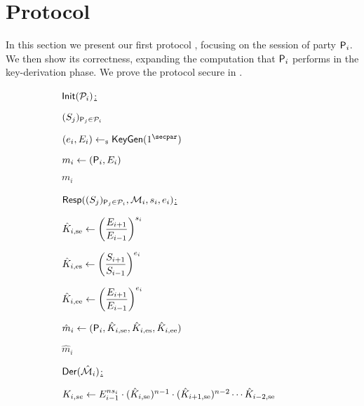 \section{Protocol}\label{sec:protocol}
In this section we present our first protocol , focusing on the session of party $\User[i]$.
We then show its correctness, expanding the computation that $\User[i]$ performs in the key-derivation phase.
We prove the protocol secure  in .

\begin{figure}
	\begin{adjustbox}{varwidth=0.9\textwidth,fbox,center,scale=0.92}
	\begin{subfigure}[t]{.45\linewidth}
		\underline{$\GAKEIni(\PartySet_i)$:}\smallskip
		\begin{nicodemus}[1]
			\item \pcfetch $(S_j)_{\User[j]\in \PartySet_i}$
			\item $(\esk_i,\epk_i) \getsr \KeyGen(1^\secpar)$  
			\item $m_i \gets (\User[i],\epk_i)$
			\item \pcbroadcast $m_i$
		\end{nicodemus}
	\end{subfigure}%
	\begin{subfigure}[t]{.5\linewidth}
		\underline{$\GAKERes((\spk_j)_{\User[j] \in \PartySet_i},\GakeIniMesSet[i],\ssk_i,\esk_i)$:} \smallskip
		\begin{nicodemus}
			\item $\tempsek{i} \gets \left( \dfrac{\epk_{i+1}}{\epk_{i-1}}\right)^{\ssk_i}$ 	
			\item $\tempesk{i} \gets \left( \dfrac{\spk_{i+1}}{\spk_{i-1}}\right)^{\esk_i}$ 	
			\item $\tempeek{i} \gets \left( \dfrac{\epk_{i+1}}{\epk_{i-1}}\right)^{\esk_i}$ 	
			\item $\hat{m}_i \gets (\User[i],\tempsek{i},\tempesk{i},\tempeek{i})$ 
			\item \pcbroadcast $\hat{m}_i$ \\
		\end{nicodemus}
	\end{subfigure}
	\begin{subfigure}{0.7\linewidth}
		\underline{$\GAKEDer(\GakeResMesSet[i])$:} \smallskip
		\begin{nicodemus}
			\item $\groupsek{i} \gets E_{i-1}^{ns_i} \cdot (\tempsek{i})^{n-1} \cdot (\tempsek{i+1})^{n-2} \cdots \tempsek{i-2}$  \\

\end{nicodemus}
\end{subfigure}
\end{adjustbox}
\end{figure}

